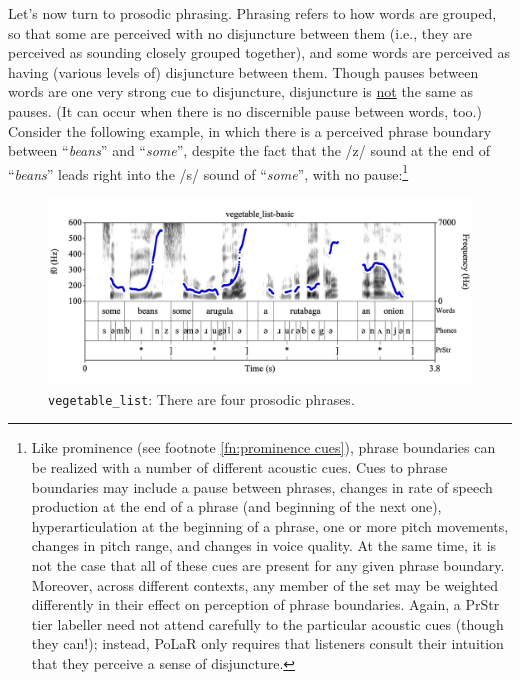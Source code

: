 \documentclass[11pt, twoside]{memoir}
\def\langtext#1{\textit{#1}}
\begin{document}
Let’s now turn to prosodic phrasing. Phrasing refers to how words are grouped, so that some are perceived with no disjuncture between them (i.e., they are perceived as sounding closely grouped together), and some words are perceived as having (various levels of) disjuncture between them. Though pauses between words are one very strong cue to disjuncture, disjuncture is \uline{not} the same as pauses. (It can occur when there is no discernible pause between words, too.) Consider the following example, in which there is a perceived phrase boundary between “\langtext{beans}” and “\langtext{some}”, despite the fact that the /z/ sound at the end of “\langtext{beans}” leads right into the /s/ sound of “\langtext{some}”, with no pause:\footnote{Like prominence (see footnote \ref{fn:prominence cues}), phrase boundaries can be realized with a number of different acoustic cues. Cues to phrase boundaries may include a pause between phrases, changes in rate of speech production at the end of a phrase (and beginning of the next one), hyperarticulation at the beginning of a phrase, one or more pitch movements, changes in pitch range, and changes in voice quality. At the same time, it is not the case that all of these cues are present for any given phrase boundary. Moreover, across different contexts, any member of the set may be weighted differently in their effect on perception of phrase boundaries. Again, a PrStr tier labeller need not attend carefully to the particular acoustic cues (though they can!); instead, PoLaR only requires that listeners consult their intuition that they perceive a sense of disjuncture.\label{fn:phrasing cues}}

\begin{figure}[H]
\centering
%
\includegraphics[width=.875\linewidth]{PrStr-vegetable_list-basic.png}
%
\caption{\texttt{vegetable\_list}: There are four prosodic phrases.%
\label{fig:vegetable list phrases}%
%
}
\end{figure}
\end{document}
